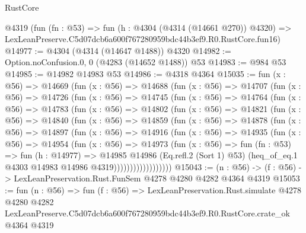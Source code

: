 \begin{lexlean}{RustCore}
\begin{coremodule}
    @4319
    (fun (fn : @53) =>
    fun (h : @4304 (@4314 (@14661 @270)) @4320) =>
    LexLeanPreserve.C5d07dcb6a600f767280959bdc44b3ef9.R0.RustCore.fun16)
@14977 := @4304 (@4314 (@14647 @1488)) @4320
@14982 := Option.noConfusion.{0, 0} (@4283 (@14652 @1488)) @53
@14983 := @984 @53
@14985 := @14982 @14983 @53
@14986 := @4318 @4364
@15035 := fun (x : @56) =>
  @14669
    (fun (x : @56) =>
    @14688
      (fun (x : @56) =>
      @14707
        (fun (x : @56) =>
        @14726
          (fun (x : @56) =>
          @14745
            (fun (x : @56) =>
            @14764
              (fun (x : @56) =>
              @14783
                (fun (x : @56) =>
                @14802
                  (fun (x : @56) =>
                  @14821
                    (fun (x : @56) =>
                    @14840
                      (fun (x : @56) =>
                      @14859
                        (fun (x : @56) =>
                        @14878
                          (fun (x : @56) =>
                          @14897
                            (fun (x : @56) =>
                            @14916
                              (fun (x : @56) =>
                              @14935
                                (fun (x : @56) =>
                                @14954
                                  (fun (x : @56) =>
                                  @14973
                                    (fun (x : @56) =>
                                    fun (fn : @53) =>
                                    fun (h : @14977) =>
                                    @14985
                                      @14986
                                      (Eq.refl.{2} (Sort 1) @53)
                                      (heq_of_eq.{1} @4303 @14983 @14986 @4319))))))))))))))))))
@15043 := (n : @56) -> (f : @56) -> LexLeanPreservation.Rust.FunSem @4278 @4280 @4282 @4364 @4319
@15053 := fun (n : @56) =>
  fun (f : @56) =>
  LexLeanPreservation.Rust.simulate
    @4278
    @4280
    @4282
    LexLeanPreserve.C5d07dcb6a600f767280959bdc44b3ef9.R0.RustCore.crate_ok
    @4364
    @4319
\end{coremodule}
\end{lexlean}

